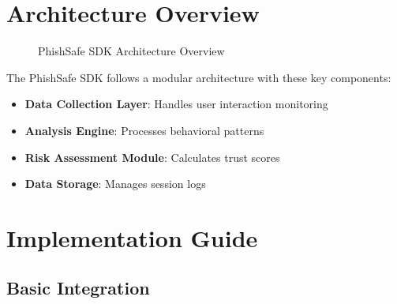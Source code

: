 \documentclass[11pt]{article}
\begin{document}
\clearpage
\section{Architecture Overview}

\begin{figure}[H]
    \centering
    \caption{PhishSafe SDK Architecture Overview}
    \label{fig:architecture}
\end{figure}

The PhishSafe SDK follows a modular architecture with these key components:

\begin{itemize}
    \item \textbf{Data Collection Layer}: Handles user interaction monitoring
    \item \textbf{Analysis Engine}: Processes behavioral patterns
    \item \textbf{Risk Assessment Module}: Calculates trust scores
    \item \textbf{Data Storage}: Manages session logs
\end{itemize}

\clearpage
\section{Implementation Guide}

\subsection{Basic Integration}
\end{document}
